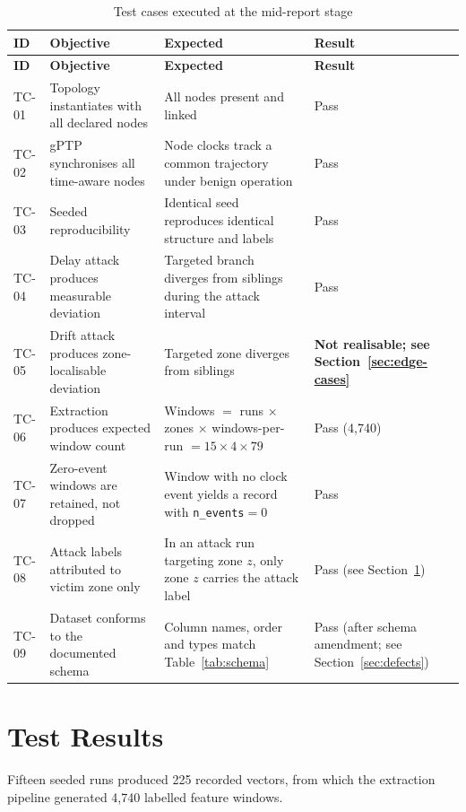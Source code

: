\begin{longtable}{p{} p{} p{} p{}}
\caption{Test cases executed at the mid-report stage}\\
\toprule
\textbf{ID} & \textbf{Objective} & \textbf{Expected} & \textbf{Result} \\
\midrule
\endfirsthead
\toprule
\textbf{ID} & \textbf{Objective} & \textbf{Expected} & \textbf{Result} \\
\midrule
\endhead
TC-01 & Topology instantiates with all declared nodes & All nodes present and linked &
Pass \\
TC-02 & gPTP synchronises all time-aware nodes & Node clocks track a common trajectory
under benign operation & Pass \\
TC-03 & Seeded reproducibility & Identical seed reproduces identical structure and labels &
Pass \\
TC-04 & Delay attack produces measurable deviation & Targeted branch diverges from
siblings during the attack interval & Pass \\
TC-05 & Drift attack produces zone-localisable deviation & Targeted zone diverges from
siblings & \textbf{Not realisable; see Section~\ref{sec:edge-cases}} \\
TC-06 & Extraction produces expected window count & Windows $=$ runs $\times$ zones
$\times$ windows-per-run $= 15 \times 4 \times 79$ & Pass (4{,}740) \\
TC-07 & Zero-event windows are retained, not dropped & Window with no clock event
yields a record with \texttt{n\_events}$=0$ & Pass \\
TC-08 & Attack labels attributed to victim zone only & In an attack run targeting zone
$z$, only zone $z$ carries the attack label & Pass (see Section~\ref{sec:test-results}) \\
TC-09 & Dataset conforms to the documented schema & Column names, order and types match
Table~\ref{tab:schema} & Pass (after schema amendment; see Section~\ref{sec:defects}) \\
\bottomrule
\end{longtable}

\section{Test Results}
\label{sec:test-results}

Fifteen seeded runs produced 225 recorded vectors, from which the extraction pipeline
generated 4{,}740 labelled feature windows.

